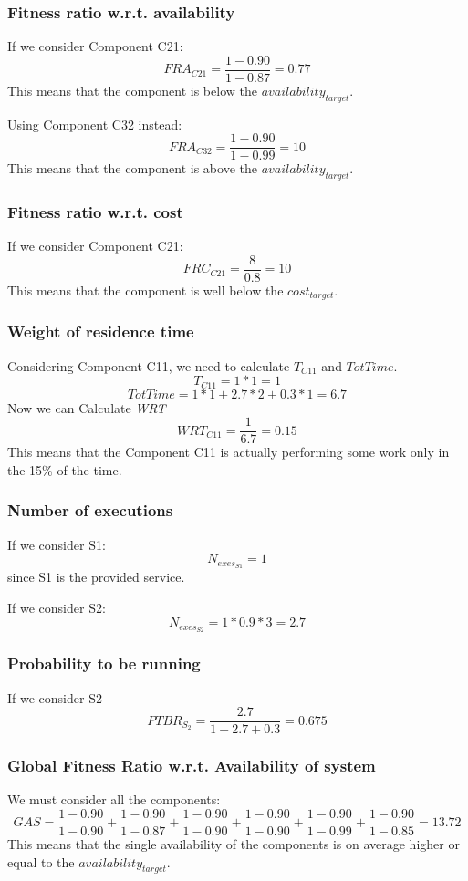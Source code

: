 \subsubsection{Fitness ratio w.r.t. availability}
If we consider Component C21:
\[ FRA_{C21} = \frac{1-0.90}{1-0.87} = 0.77 \]
This means that the component is below the \emph{$availability_{target}$}.

\noindent Using Component C32 instead:
\[ FRA_{C32} = \frac{1-0.90}{1-0.99} = 10 \]
This means that the component is above the \emph{$availability_{target}$}.
\subsubsection{Fitness ratio w.r.t. cost}
If we consider Component C21:
\[FRC_{C21} = \frac{8}{0.8}=10\]
This means that the component is well below the \emph{$cost_{target}$}.
\subsubsection{Weight of residence time}
Considering Component C11, we need to calculate $T_{C11}$ and $TotTime$.
\[T_{C11} = 1 * 1 = 1\]
\[TotTime = 1 * 1 + 2.7 * 2 + 0.3 * 1 = 6.7\]
Now we can Calculate \emph{WRT}
\[WRT_{C11} = \frac{1}{6.7} = 0.15\]
This means that the Component C11 is actually performing some work only in the 15\% of the time.
\subsubsection{Number of executions}
If we consider S1:
\[N_{exes_{S1}} = 1\]
since S1 is the provided service.

\noindent If we consider S2:
\[N_{exes_{S2}} = 1 * 0.9 * 3 = 2.7\]
\subsubsection{Probability to be running}
If we consider S2
\[PTBR_{S_2} = \frac{2.7}{1 + 2.7 + 0.3} = 0.675\]
\subsubsection{Global Fitness Ratio w.r.t. Availability of system}
We must consider all the components:
\[GAS = \frac{1-0.90}{1-0.90} + \frac{1-0.90}{1-0.87} + \frac{1-0.90}{1-0.90} + \frac{1-0.90}{1-0.90} + \frac{1-0.90}{1-0.99} + \frac{1-0.90}{1-0.85} = 13.72\]
This means that the single availability of the components is on average higher or equal to the \emph{$availability_{target}$}.
